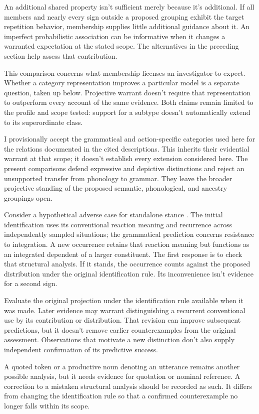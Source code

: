 An additional shared property isn't sufficient merely because it's
additional. If all members and nearly every sign outside a proposed
grouping exhibit the target repetition behavior, membership supplies
little additional guidance about it. An imperfect probabilistic association can be
informative when it changes a warranted expectation at the stated
scope. The alternatives in the preceding section help assess that
contribution.

This comparison concerns what membership licenses an investigator to
expect. Whether a category representation improves a particular model
is a separate question, taken up below. Projective warrant doesn't
require that representation to outperform every account of the same
evidence. Both claims remain limited to the profile and scope tested:
support for a subtype doesn't automatically extend to its superordinate
class.

I provisionally accept the grammatical and action-specific categories
used here for the relations documented in the cited descriptions.
This inherits their evidential warrant at that scope; it doesn't
establish every extension considered here. The present comparisons
defend expressive and depictive distinctions and reject an unsupported
transfer from phonology to grammar. They leave the broader projective
standing of the proposed semantic, phonological, and ancestry groupings
open.

Consider a hypothetical adverse case for standalone stance .
The initial identification uses its conventional reaction meaning and
recurrence across independently sampled situations; the grammatical
prediction concerns resistance to integration. A new occurrence retains
that reaction meaning but functions as an integrated dependent of a
larger constituent. The first response is to check that structural
analysis. If it stands, the occurrence counts against the proposed
distribution under the original identification rule. Its inconvenience
isn't evidence for a second sign.

Evaluate the original projection under the identification rule available
when it was made. Later evidence may warrant distinguishing a recurrent
conventional use by its contribution or distribution. That revision
can improve subsequent predictions, but it doesn't remove earlier
counterexamples from the original assessment. Observations that motivate
a new distinction don't also supply independent confirmation of its
predictive success.

A quoted token or a productive noun denoting an utterance remains
another possible analysis, but it needs evidence for quotation or
nominal reference. A correction to a mistaken structural analysis should
be recorded as such. It differs from changing the identification rule
so that a confirmed counterexample no longer falls within its scope.


